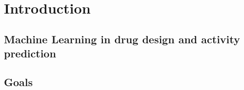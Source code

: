 \chapter{Introduction}\label{cha:Introduction}


\pagebreak

\section{Machine Learning in drug design and activity prediction}


\section{Goals}



